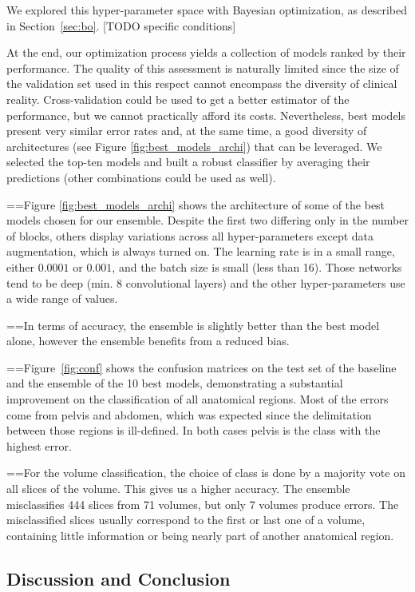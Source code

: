 We explored this hyper-parameter space with Bayesian optimization, as described in Section~\ref{sec:bo}. [TODO specific conditions]

At the end, our optimization process yields a collection of models ranked by their performance. The quality of this assessment is naturally limited since the size of the validation set used in this respect cannot encompass the diversity of clinical reality. Cross-validation could be used to get a better estimator of the performance, but we cannot practically afford its costs. Nevertheless, best models present very similar error rates and, at the same time, a good diversity of architectures (see Figure \ref{fig:best_models_archi}) that can be leveraged. We selected the top-ten models and built a robust classifier by averaging their predictions (other combinations could be used as well).

==Figure \ref{fig:best_models_archi} shows the architecture of some of the best models chosen for our ensemble. Despite the first two differing only in the number of blocks, others display variations across all hyper-parameters except data augmentation, which is always turned on. The learning rate is in a small range, either $0.0001$ or $0.001$, and the batch size is small (less than 16). Those networks tend to be deep (min. 8 convolutional layers) and the other hyper-parameters use a wide range of values.

==In terms of accuracy, the ensemble is slightly better than the best model alone, however the ensemble benefits from a reduced bias.

==Figure~\ref{fig:conf} shows the confusion matrices on the test set of the baseline and the ensemble of the 10 best models, demonstrating a substantial improvement on the classification of all anatomical regions. Most of the errors come from pelvis and abdomen, which was expected since the delimitation between those regions is ill-defined. In both cases pelvis is the class with the highest error.

==For the volume classification, the choice of class is done by a majority vote on all slices of the volume. This gives us a higher accuracy. The ensemble misclassifies 444 slices from 71 volumes, but only 7 volumes produce errors. The misclassified slices usually correspond to the first or last one of a volume, containing little information or being nearly part of another anatomical region.

\subsection{Discussion and Conclusion}

